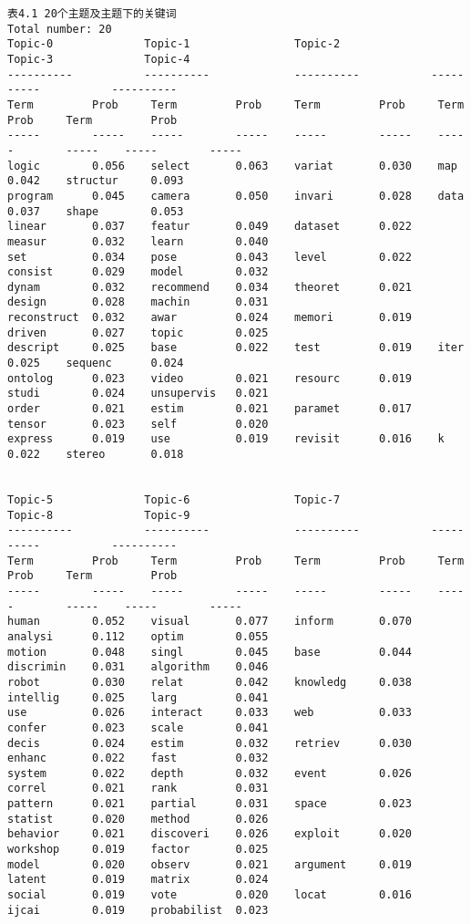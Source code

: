 \documentclass[11pt]{article}
\begin{document}
    \begin{Verbatim}[commandchars=\\\{\}]
                                  表4.1 20个主题及主题下的关键词               
Total number: 20
Topic-0              Topic-1                Topic-2              Topic-3              Topic-4               
----------           ----------             ----------           ----------           ----------            
Term         Prob     Term         Prob     Term         Prob     Term         Prob     Term         Prob    
-----        -----    -----        -----    -----        -----    -----        -----    -----        -----   
logic        0.056    select       0.063    variat       0.030    map          0.042    structur     0.093   
program      0.045    camera       0.050    invari       0.028    data         0.037    shape        0.053   
linear       0.037    featur       0.049    dataset      0.022    measur       0.032    learn        0.040   
set          0.034    pose         0.043    level        0.022    consist      0.029    model        0.032   
dynam        0.032    recommend    0.034    theoret      0.021    design       0.028    machin       0.031   
reconstruct  0.032    awar         0.024    memori       0.019    driven       0.027    topic        0.025   
descript     0.025    base         0.022    test         0.019    iter         0.025    sequenc      0.024   
ontolog      0.023    video        0.021    resourc      0.019    studi        0.024    unsupervis   0.021   
order        0.021    estim        0.021    paramet      0.017    tensor       0.023    self         0.020   
express      0.019    use          0.019    revisit      0.016    k            0.022    stereo       0.018   


Topic-5              Topic-6                Topic-7              Topic-8              Topic-9               
----------           ----------             ----------           ----------           ----------            
Term         Prob     Term         Prob     Term         Prob     Term         Prob     Term         Prob    
-----        -----    -----        -----    -----        -----    -----        -----    -----        -----   
human        0.052    visual       0.077    inform       0.070    analysi      0.112    optim        0.055   
motion       0.048    singl        0.045    base         0.044    discrimin    0.031    algorithm    0.046   
robot        0.030    relat        0.042    knowledg     0.038    intellig     0.025    larg         0.041   
use          0.026    interact     0.033    web          0.033    confer       0.023    scale        0.041   
decis        0.024    estim        0.032    retriev      0.030    enhanc       0.022    fast         0.032   
system       0.022    depth        0.032    event        0.026    correl       0.021    rank         0.031   
pattern      0.021    partial      0.031    space        0.023    statist      0.020    method       0.026   
behavior     0.021    discoveri    0.026    exploit      0.020    workshop     0.019    factor       0.025   
model        0.020    observ       0.021    argument     0.019    latent       0.019    matrix       0.024   
social       0.019    vote         0.020    locat        0.016    ijcai        0.019    probabilist  0.023   


\end{Verbatim}
\end{document}

